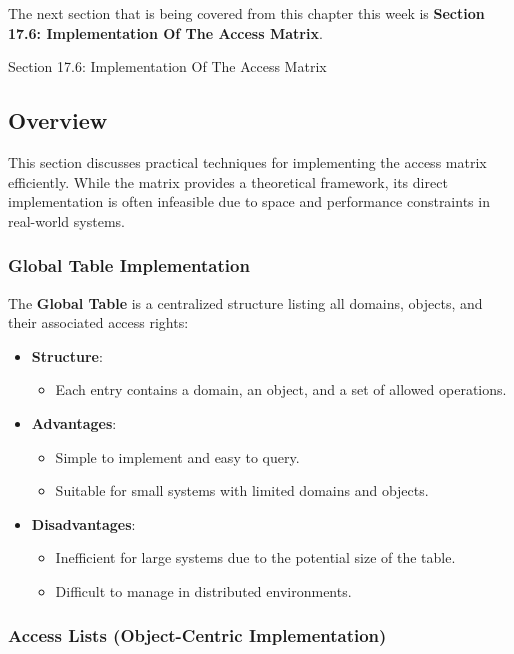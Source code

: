 The next section that is being covered from this chapter this week is \textbf{Section 17.6: Implementation Of The Access Matrix}.

\begin{notes}{Section 17.6: Implementation Of The Access Matrix}
    \subsection*{Overview}

    This section discusses practical techniques for implementing the access matrix efficiently. While the matrix provides a theoretical framework, its direct implementation is often infeasible due to 
    space and performance constraints in real-world systems.
    
    \subsubsection*{Global Table Implementation}
    
    The \textbf{Global Table} is a centralized structure listing all domains, objects, and their associated access rights:
    \begin{itemize}
        \item \textbf{Structure}:
        \begin{itemize}
            \item Each entry contains a domain, an object, and a set of allowed operations.
        \end{itemize}
        \item \textbf{Advantages}:
        \begin{itemize}
            \item Simple to implement and easy to query.
            \item Suitable for small systems with limited domains and objects.
        \end{itemize}
        \item \textbf{Disadvantages}:
        \begin{itemize}
            \item Inefficient for large systems due to the potential size of the table.
            \item Difficult to manage in distributed environments.
        \end{itemize}
    \end{itemize}
    
    \subsubsection*{Access Lists (Object-Centric Implementation)}
    

\end{notes}

